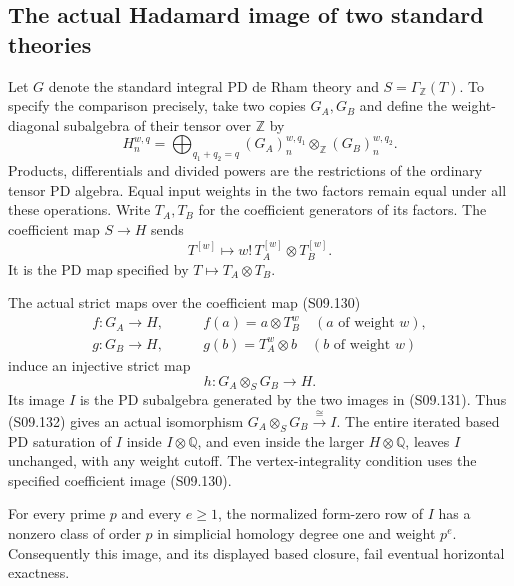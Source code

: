 \subsection{The actual Hadamard image of two standard theories}

Let $G$ denote the standard integral PD de Rham theory and
$S=\Gamma_{\mathbb Z}(T)$.  To specify the comparison
precisely, take two copies $G_A,G_B$ and define the
weight-diagonal subalgebra of their tensor over $\mathbb Z$ by
\[
 H_n^{w,q}=\bigoplus_{q_1+q_2=q}
          (G_A)_n^{w,q_1}\otimes_{\mathbb Z}
          (G_B)_n^{w,q_2}.
 \tag{S09.129}
\]
Products, differentials and divided powers are the restrictions
of the ordinary tensor PD algebra.  Equal input weights in
the two factors remain equal under all these operations.
Write $T_A,T_B$ for the coefficient generators of its factors.
The coefficient map $S\to H$ sends
\[
 T^{[w]}\longmapsto
             w!\,T_A^{[w]}\otimes T_B^{[w]}.
 \tag{S09.130}
\]
It is the PD map specified by $T\mapsto T_A\otimes T_B$.

\begin{proposition}
\label{AS0926}
The actual strict maps over the coefficient map (S09.130)
\[
 \begin{split}
 f:G_A\longrightarrow H,&\qquad
             f(a)=a\otimes T_B^w\quad(a\text{ of weight }w),\\
 g:G_B\longrightarrow H,&\qquad
             g(b)=T_A^w\otimes b\quad(b\text{ of weight }w)
 \end{split}                                                     \tag{S09.131}
\]
induce an injective strict map
\[
                    h:G_A\otimes_S G_B\longrightarrow H.
 \tag{S09.132}
\]
Its image $I$ is the PD subalgebra generated by the two
images in (S09.131).  Thus (S09.132) gives an actual
isomorphism $G_A\otimes_S G_B\xrightarrow{\cong}I$.
The entire iterated based PD saturation of $I$ inside
$I\otimes\mathbb Q$, and even inside the larger
$H\otimes\mathbb Q$, leaves $I$ unchanged, with any
weight cutoff.  The vertex-integrality condition uses
the specified coefficient image (S09.130).

For every prime $p$ and every $e\geq1$, the normalized
form-zero row of $I$ has a nonzero class of order $p$
in simplicial homology degree one and weight $p^e$.
Consequently this image, and its displayed based closure,
fail eventual horizontal exactness.
\end{proposition}

